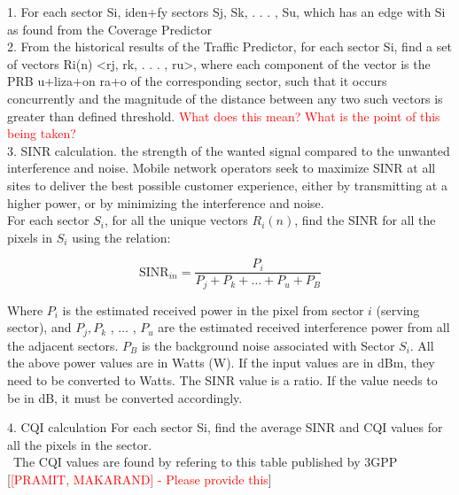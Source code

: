 1. For each sector Si, iden+fy sectors Sj, Sk, . . . , Su, which has an edge with Si as found from the Coverage Predictor \\
2. From the historical results of the Traffic Predictor, for each sector Si, find a set of vectors Ri(n) <rj, rk, . . . , ru>, where each component of the vector is the PRB u+liza+on ra+o of the corresponding sector, such that it occurs concurrently and the magnitude of the distance between any two such vectors is greater than defined threshold. \textcolor{red}{What does this mean? What is the point of this being taken?} \\

3. SINR calculation. the strength of the wanted signal compared to the unwanted interference and noise. Mobile network operators seek to maximize SINR at all sites to deliver the best possible customer experience, either by transmitting at a higher power, or by minimizing the interference and noise. \\

For each sector $S_i$, for all the unique vectors $R_i(n)$, find the SINR for all the pixels in $S_i$ using the relation:

\[
\text{SINR}_{in} = \frac{P_i}{P_j + P_k + \ldots + P_u + P_B}
\]

Where $P_i$ is the estimated received power in the pixel from sector $i$ (serving sector), and $P_j, P_k$ , $\ldots$ , $P_u$ are the estimated received interference power from all the adjacent sectors. $P_B$ is the background noise associated with Sector $S_i$. All the above power values are in Watts (W). If the input values are in dBm, they need to be converted to Watts. The SINR value is a ratio. If the value needs to be in dB, it must be converted accordingly.

4. CQI calculation 
For each sector Si, find the average SINR and CQI values for all the pixels in the sector. \\\
The CQI values are found by refering to this table published by 3GPP [\textcolor{red}{[PRAMIT, MAKARAND] - Please provide this}] \\

